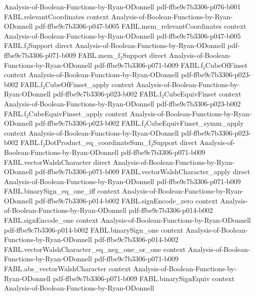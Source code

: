 \begin{theorem}
  {Analysis-of-Boolean-Functions-by-Ryan-ODonnell}
  {pdf-ffbe9c7b3306-p076-b001}
\proofstep
  {FABL.relevantCoordinates}
  {context}
  {Analysis-of-Boolean-Functions-by-Ryan-ODonnell}
  {pdf-ffbe9c7b3306-p047-b005}
\proofstep
  {FABL.mem_relevantCoordinates}
  {context}
  {Analysis-of-Boolean-Functions-by-Ryan-ODonnell}
  {pdf-ffbe9c7b3306-p047-b005}
\proofstep
  {FABL.f₂Support}
  {direct}
  {Analysis-of-Boolean-Functions-by-Ryan-ODonnell}
  {pdf-ffbe9c7b3306-p071-b009}
\proofstep
  {FABL.mem_f₂Support}
  {direct}
  {Analysis-of-Boolean-Functions-by-Ryan-ODonnell}
  {pdf-ffbe9c7b3306-p071-b009}
\proofstep
  {FABL.f₂CubeOfFinset}
  {context}
  {Analysis-of-Boolean-Functions-by-Ryan-ODonnell}
  {pdf-ffbe9c7b3306-p023-b002}
\proofstep
  {FABL.f₂CubeOfFinset_apply}
  {context}
  {Analysis-of-Boolean-Functions-by-Ryan-ODonnell}
  {pdf-ffbe9c7b3306-p023-b002}
\proofstep
  {FABL.f₂CubeEquivFinset}
  {context}
  {Analysis-of-Boolean-Functions-by-Ryan-ODonnell}
  {pdf-ffbe9c7b3306-p023-b002}
\proofstep
  {FABL.f₂CubeEquivFinset_apply}
  {context}
  {Analysis-of-Boolean-Functions-by-Ryan-ODonnell}
  {pdf-ffbe9c7b3306-p023-b002}
\proofstep
  {FABL.f₂CubeEquivFinset_symm_apply}
  {context}
  {Analysis-of-Boolean-Functions-by-Ryan-ODonnell}
  {pdf-ffbe9c7b3306-p023-b002}
\proofstep
  {FABL.f₂DotProduct_eq_coordinateSum_f₂Support}
  {direct}
  {Analysis-of-Boolean-Functions-by-Ryan-ODonnell}
  {pdf-ffbe9c7b3306-p071-b009}
\proofstep
  {FABL.vectorWalshCharacter}
  {direct}
  {Analysis-of-Boolean-Functions-by-Ryan-ODonnell}
  {pdf-ffbe9c7b3306-p071-b009}
\proofstep
  {FABL.vectorWalshCharacter_apply}
  {direct}
  {Analysis-of-Boolean-Functions-by-Ryan-ODonnell}
  {pdf-ffbe9c7b3306-p071-b009}
\proofstep
  {FABL.binarySign_eq_one_iff}
  {context}
  {Analysis-of-Boolean-Functions-by-Ryan-ODonnell}
  {pdf-ffbe9c7b3306-p014-b002}
\proofstep
  {FABL.signEncode_zero}
  {context}
  {Analysis-of-Boolean-Functions-by-Ryan-ODonnell}
  {pdf-ffbe9c7b3306-p014-b002}
\proofstep
  {FABL.signEncode_one}
  {context}
  {Analysis-of-Boolean-Functions-by-Ryan-ODonnell}
  {pdf-ffbe9c7b3306-p014-b002}
\proofstep
  {FABL.binarySign_one}
  {context}
  {Analysis-of-Boolean-Functions-by-Ryan-ODonnell}
  {pdf-ffbe9c7b3306-p014-b002}
\proofstep
  {FABL.vectorWalshCharacter_eq_neg_one_or_one}
  {context}
  {Analysis-of-Boolean-Functions-by-Ryan-ODonnell}
  {pdf-ffbe9c7b3306-p071-b009}
\proofstep
  {FABL.abs_vectorWalshCharacter}
  {context}
  {Analysis-of-Boolean-Functions-by-Ryan-ODonnell}
  {pdf-ffbe9c7b3306-p071-b009}
\proofstep
  {FABL.binarySignEquiv}
  {context}
  {Analysis-of-Boolean-Functions-by-Ryan-ODonnell}

\end{theorem}
